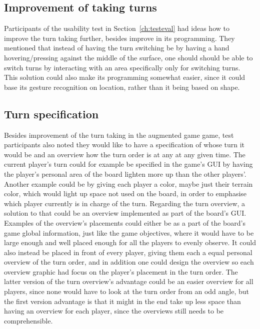 \subsection{Improvement of taking turns}
Participants of the usability test in Section~\ref{ch:testeval} had ideas how to improve the turn taking further, besides improve in its programming. They mentioned that instead of having the turn switching be by having a hand hovering/pressing against the middle of the surface, one should should be able to switch turns by interacting with an area specifically only for switching turns. This solution could  also make its programming somewhat easier, since it could base its gesture recognition on location, rather than it being based on shape.

\subsection{Turn specification}
Besides improvement of the turn taking in the augmented game game, test participants also noted they would like to have a specification of whose turn it would be and an overview how the turn order is at any at any given time. The current player's turn could for example be specified in the game's GUI by having the player's personal area of the board lighten more up than the other players'. Another example could be by giving each player a color, maybe just their terrain color, which would light up space not used on the board, in order to emphasise which player currently is in charge of the turn.
Regarding the turn overview, a solution to that could be an overview implemented as part of the board's GUI. Examples of the overview's placements could either be as a part of the board's game global information, just like the game objectives, where it would have to be large enough and well placed enough for all the players to evenly observe. It could also instead be placed in front of every player, giving them each a equal personal overview of the turn order, and in addition one could design the overview so each overview graphic had focus on the player's placement in the turn order. The latter version of the turn overview's advantage could be an easier overview for all players, since none would have to look at the turn order from an odd angle, but the first version advantage is that it might in the end take up less space than having an overview for each player, since the overviews still needs to be comprehensible.

